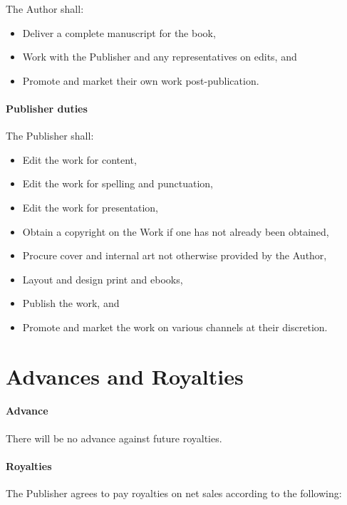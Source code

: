 \documentclass[12pt,letterpaper]{article}
\begin{document}
The Author shall:

\begin{itemize}
    \item Deliver a complete manuscript for the book,
    \item Work with the Publisher and any representatives on edits, and
    \item Promote and market their own work post-publication.
\end{itemize}

\paragraph{Publisher duties}

The Publisher shall:

\begin{itemize}
    \item Edit the work for content,
    \item Edit the work for spelling and punctuation,
    \item Edit the work for presentation,
    \item Obtain a copyright on the Work if one has not already been obtained,
    \item Procure cover and internal art not otherwise provided by the Author,
    \item Layout and design print and ebooks,
    \item Publish the work, and
    \item Promote and market the work on various channels at their discretion.
\end{itemize}

\section{Advances and Royalties}

\paragraph{Advance}

There will be no advance against future royalties.

\paragraph{Royalties}

The Publisher agrees to pay royalties on net sales according to the following:
\end{document}
